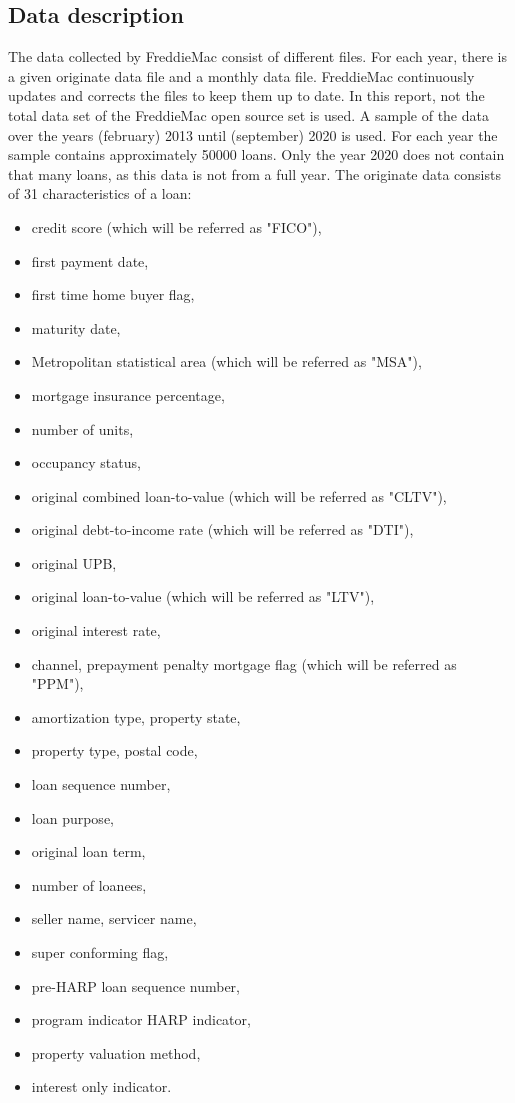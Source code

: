 \subsection{Data description}
    The data collected by FreddieMac consist of different files. 
    For each year, there is a given originate data file and a monthly 
    data file. FreddieMac continuously 
    updates and corrects the files to keep them up to date. 
    In this report, not the total data set of the FreddieMac open source 
    set is used. 
    A sample of the data over the years (february) 2013 until (september) 2020 
    is used. For each year the sample contains approximately 50000 loans.
    Only the year 2020 does not contain that many loans, as this data is 
    not from a full year.
    The originate data consists of 31 characteristics of a loan:
    \begin{itemize}
        \item credit score (which will be referred as "FICO"), 
        \item first payment date, 
        \item first time home buyer flag, 
        \item maturity date, 
        \item Metropolitan statistical area (which will be referred as "MSA"), 
        \item mortgage insurance percentage,
        \item  number of units, 
        \item occupancy status, 
        \item original combined loan-to-value (which will be referred as "CLTV"), 
        \item original debt-to-income rate (which will be referred as "DTI"), 
        \item original UPB, 
        \item original loan-to-value (which will be referred as "LTV"), 
        \item original interest rate, 
        \item channel, prepayment penalty mortgage flag 
        (which will be referred as "PPM"), 
        \item amortization type, property state, 
        \item property type, postal code, 
        \item loan sequence number, 
        \item loan purpose, 
        \item original loan term, 
        \item number of loanees, 
        \item seller name, servicer name, 
        \item super conforming flag, 
        \item pre-HARP loan sequence number, 
        \item program indicator HARP indicator, 
        \item property valuation method,
        \item interest only indicator.
    \end{itemize} 
